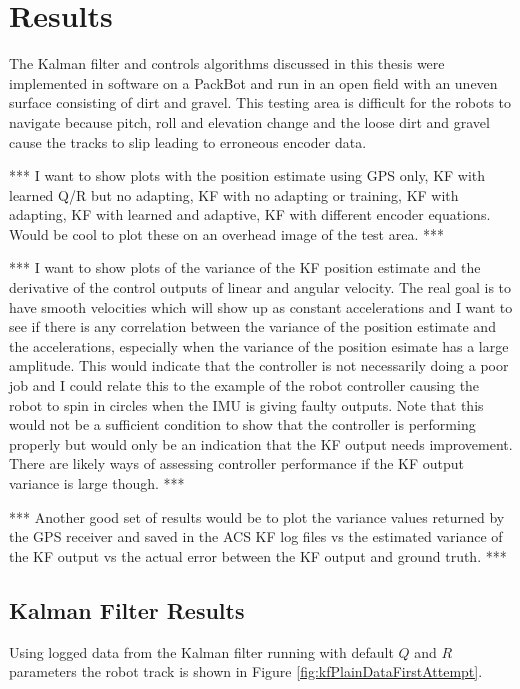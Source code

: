 \chapter{Results}
\label{ch:results}
The Kalman filter and controls algorithms discussed in this thesis were implemented in software on a PackBot and run in an open field with an uneven surface consisting of dirt and gravel. This testing area is difficult for the robots to navigate because pitch, roll and elevation change and the loose dirt and gravel cause the tracks to slip leading to erroneous encoder data.

*** I want to show plots with the position estimate using GPS only, KF with learned Q/R but no adapting, KF with no adapting or training, KF with adapting, KF with learned and adaptive, KF with different encoder equations. Would be cool to plot these on an overhead image of the test area. ***

*** I want to show plots of the variance of the KF position estimate and the derivative of the control outputs of linear and angular velocity. The real goal is to have smooth velocities which will show up as constant accelerations and I want to see if there is any correlation between the variance of the position estimate and the accelerations, especially when the variance of the position esimate has a large amplitude. This would indicate that the controller is not necessarily doing a poor job and I could relate this to the example of the robot controller causing the robot to spin in circles when the IMU is giving faulty outputs. Note that this would not be a sufficient condition to show that the controller is performing properly but would only be an indication that the KF output needs improvement. There are likely ways of assessing controller performance if the KF output variance is large though. ***

*** Another good set of results would be to plot the variance values returned by the GPS receiver and saved in the ACS KF log files vs the estimated variance of the KF output vs the actual error between the KF output and ground truth. ***

\section{Kalman Filter Results}
\label{sec:kfResults}
Using logged data from the Kalman filter running with default $Q$ and $R$ parameters the robot track is shown in Figure \ref{fig:kfPlainDataFirstAttempt}.

